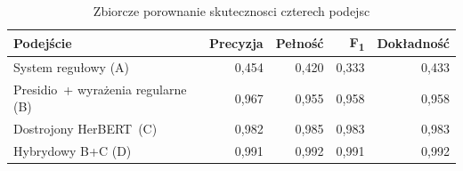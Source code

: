 
\begin{table}[H]
\centering
\caption{Zbiorcze porownanie skutecznosci czterech podejsc}
\label{tab:comparison}
\renewcommand{\arraystretch}{1.2}
\begin{tabular}{lrrrr}
\hline
\textbf{Podejście} & \textbf{Precyzja} & \textbf{Pełność} & \textbf{F\textsubscript{1}} & \textbf{Dokładność} \\
\hline
System regułowy (A) & 0{,}454 & 0{,}420 & 0{,}333 & 0{,}433 \\
Presidio\ + wyrażenia regularne (B) & 0{,}967 & 0{,}955 & 0{,}958 & 0{,}958 \\
Dostrojony HerBERT\ (C) & 0{,}982 & 0{,}985 & 0{,}983 & 0{,}983 \\
Hybrydowy B+C (D) & 0{,}991 & 0{,}992 & 0{,}991 & 0{,}992 \\
\hline
\end{tabular}
\end{table}

